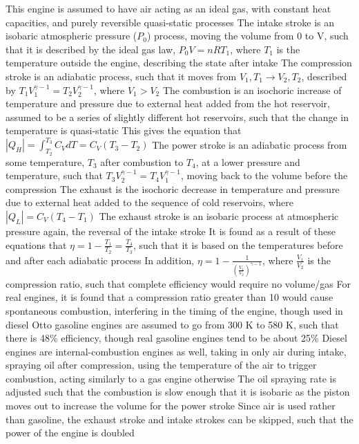 \begin{outline*}
\2 This engine is assumed to have air acting as an ideal gas, with constant heat capacities, and purely reversible quasi-static processes
\2 The intake stroke is an isobaric atmospheric pressure ($P_0$) process, moving the volume from 0 to V, such that it is described by the ideal gas law, $P_0V = nRT_1$, where $T_1$ is the temperature outside the engine, describing the state after intake
\2 The compression stroke is an adiabatic process, such that it moves from $V_1, T_1 \to V_2, T_2$, described by $T_1V_1^{\gamma - 1} = T_2V_2^{\gamma - 1}$, where $V_1 > V_2$
\2 The combustion is an isochoric increase of temperature and pressure due to external heat added from the hot reservoir, assumed to be a series of slightly different hot reservoirs, such that the change in temperature is quasi-static
\3 This gives the equation that $|Q_H| = \int^{T_3}_{T_2}C_VdT = C_V(T_3 - T_2)$
\2 The power stroke is an adiabatic process from some temperature, $T_3$ after combustion to $T_4$, at a lower pressure and temperature, such that $T_3V_2^{\gamma - 1} = T_4V_1^{\gamma - 1}$, moving back to the volume before the compression
\2 The exhaust is the isochoric decrease in temperature and pressure due to external heat added to the sequence of cold reservoirs, where $|Q_L| = C_V(T_4 - T_1)$
\2 The exhaust stroke is an isobaric process at atmospheric pressure again, the reversal of the intake stroke
\2 It is found as a result of these equations that $\eta = 1 - \frac{T_1}{T_2} = \frac{T_4}{T_3}$, such that it is based on the temperatures before and after each adiabatic process
\3 In addition, $\eta = 1 - \frac{1}{(\frac{V_1}{V_2})^{\gamma - 1}}$, where $\frac{V_1}{V_2}$ is the compression ratio, such that complete efficiency would require no volume/gas
\4 For real engines, it is found that a compression ratio greater than 10 would cause spontaneous combustion, interfering in the timing of the engine, though used in diesel
\3 Otto gasoline engines are assumed to go from 300 K to 580 K, such that there is 48\% efficiency, though real gasoline engines tend to be about 25\%
\1 Diesel engines are internal-combustion engines as well, taking in only air during intake, spraying oil after compression, using the temperature of the air to trigger combustion, acting similarly to a gas engine otherwise
\2 The oil spraying rate is adjusted such that the combustion is slow enough that it is isobaric as the piston moves out to increase the volume for the power stroke
\2 Since air is used rather than gasoline, the exhaust stroke and intake strokes can be skipped,  such that the power of the engine is doubled

\end{outline*}
